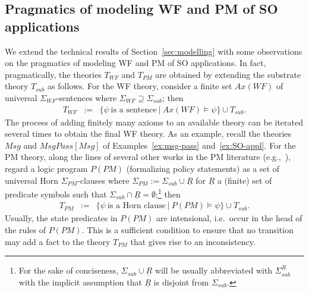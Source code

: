 \documentclass[conference]{IEEEtran}
\begin{document}
\begin{LONG}
\subsection{Pragmatics of modeling WF and PM of SO applications}\label{sec:pragmatics-modeling}
We extend the technical results of Section~\ref{sec:modelling} with some observations on the pragmatics of modeling WF and PM of SO applications. In fact, pragmatically, the theories $T_\mathit{WF}$ and $T_\mathit{PM}$ are obtained by
extending the substrate theory $T_\mathit{sub}$ as follows.  For the WF
theory, consider a finite set $Ax(WF)$ of universal
$\Sigma_\mathit{WF}$-sentences where $\Sigma_\mathit{WF}\supseteq \Sigma_\mathit{sub}$;
then
\begin{eqnarray*}
  T_\mathit{WF} & := & \{ \psi ~\mbox{is a sentence} ~|~ 
                   Ax(WF)\models \psi \} \cup T_\mathit{sub} .
\end{eqnarray*}
The process of adding finitely many axioms to an available theory can
be iterated several times to obtain the final WF theory.  As an
example, recall the theories $\mathit{Msg}$ and 
$\mathit{MsgPass}[\mathit{Msg}]$ of Examples~\ref{ex:msg-pass} and~\ref{ex:SO-appl}.
For the PM theory, along the lines of several other works in the PM
literature (e.g.,~\cite{SPKI-SDSI-in-FOL}), regard a logic program
$P(PM)$ (formalizing policy statements) as a set of universal Horn
$\Sigma_\mathit{PM}$-clauses where $\Sigma_\mathit{PM} := \Sigma_\mathit{sub} \cup
\underline{R}$ for $\underline{R}$ a (finite) set of predicate symbols
such that $\Sigma_\mathit{sub}\cap \underline{R}=\emptyset$;\footnote{For the
  sake of conciseness, $\Sigma_\mathit{sub}\cup \underline{R}$ will be
  usually abbreviated with $\Sigma_\mathit{sub}^{\underline{R}}$ with the implicit 
  assumption that $\underline{R}$ is disjoint from
  $\Sigma_\mathit{sub}$.} then
\begin{eqnarray*}
  T_\mathit{PM} & := & \{ \psi ~\mbox{is a Horn clause} ~|~ 
                   P(PM)\models \psi \} \cup T_\mathit{sub} .
\end{eqnarray*}
Usually, the state predicates in $P(\mathit{PM})$ 
are intensional, i.e.\ occur in the
head of the rules of $P(PM)$.  This is a sufficient condition to
ensure that no transition may add a fact to the theory $T_\mathit{PM}$ that
gives rise to an inconsistency.


\end{LONG}
\end{document}
